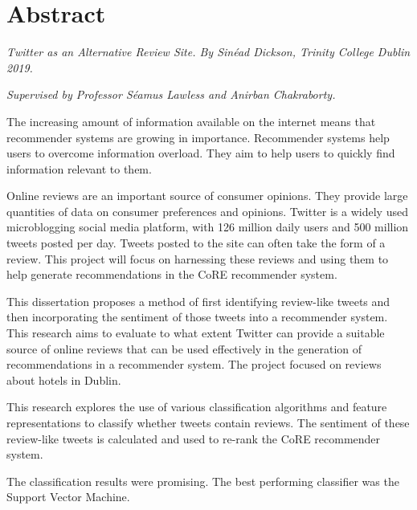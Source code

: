 \chapter{Abstract}

\emph{Twitter as an Alternative Review Site. By Sinéad Dickson, Trinity College Dublin 2019.}

\emph{Supervised by Professor Séamus Lawless and Anirban Chakraborty.}

The increasing amount of information available on the internet means that recommender systems are growing in importance. Recommender systems help users to overcome information overload. They aim to help users to quickly find information relevant to them.

Online reviews are an important source of consumer opinions. They provide large quantities of data on consumer preferences and opinions. Twitter is a widely used microblogging social media platform, with 126 million daily users and 500 million tweets posted per day. Tweets posted to the site can often take the form of a review. This project will focus on harnessing these reviews and using them to help generate recommendations in the CoRE recommender system.

This dissertation proposes a method of first identifying review-like tweets and then incorporating the sentiment of those tweets into a recommender system. This research aims to evaluate to what extent Twitter can provide a suitable source of online reviews that can be used effectively in the generation of recommendations in a recommender system. The project focused on reviews about hotels in Dublin.

This research explores the use of various classification algorithms and feature representations to classify whether tweets contain reviews. The sentiment of these review-like tweets is calculated and used to re-rank the CoRE recommender system.

The classification results were promising. The best performing classifier was the Support Vector Machine. %









